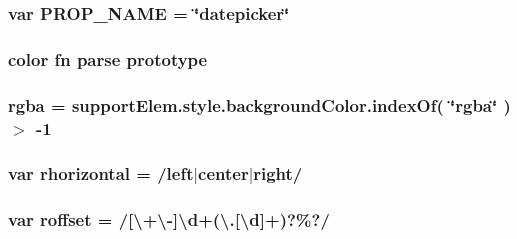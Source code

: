 \hypertarget{jquery-ui_8js_a2e9871208b15e301d81e806f0c9de1f6}{
\subsubsection[{P\+R\+O\+P\+\_\+\+N\+A\+M\+E}]{\setlength{\rightskip}{0pt plus 5cm}var P\+R\+O\+P\+\_\+\+N\+A\+M\+E = \char`\"{}datepicker\char`\"{}}}\label{jquery-ui_8js_a2e9871208b15e301d81e806f0c9de1f6}
\hypertarget{jquery-ui_8js_afe553f4bcc5629b9471196f77a7aec06}{
\subsubsection[{prototype}]{\setlength{\rightskip}{0pt plus 5cm}color {\bf fn} parse prototype}}\label{jquery-ui_8js_afe553f4bcc5629b9471196f77a7aec06}
\hypertarget{jquery-ui_8js_a3afca6223e13207736ffd9de9d1fa382}{
\subsubsection[{rgba}]{ rgba = support\+Elem.\+style.\+background\+Color.\+index\+Of( \char`\"{}rgba\char`\"{} ) $>$ -\/1}}\label{jquery-ui_8js_a3afca6223e13207736ffd9de9d1fa382}
\hypertarget{jquery-ui_8js_a764bcd729a3f50032829801f39102435}{
\subsubsection[{rhorizontal}]{\setlength{\rightskip}{0pt plus 5cm}var rhorizontal = /left$\vert$center$\vert$right/}}\label{jquery-ui_8js_a764bcd729a3f50032829801f39102435}
\hypertarget{jquery-ui_8js_a94f247e5b28ed1bdb749ac6921772c39}{
\subsubsection[{roffset}]{\setlength{\rightskip}{0pt plus 5cm}var roffset = /\mbox{[}\textbackslash{}+\textbackslash{}-\/\mbox{]}\textbackslash{}{\bf d}+(\textbackslash{}.\mbox{[}\textbackslash{}{\bf d}\mbox{]}+)?\%?/}}\label{jquery-ui_8js_a94f247e5b28ed1bdb749ac6921772c39}
